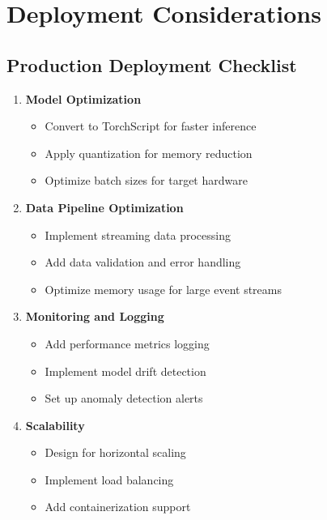 \documentclass[12pt,a4paper]{article}
\begin{document}
\section{Deployment Considerations}

\subsection{Production Deployment Checklist}

\begin{enumerate}
    \item \textbf{Model Optimization}
    \begin{itemize}
        \item Convert to TorchScript for faster inference
        \item Apply quantization for memory reduction
        \item Optimize batch sizes for target hardware
    \end{itemize}
    
    \item \textbf{Data Pipeline Optimization}
    \begin{itemize}
        \item Implement streaming data processing
        \item Add data validation and error handling
        \item Optimize memory usage for large event streams
    \end{itemize}
    
    \item \textbf{Monitoring and Logging}
    \begin{itemize}
        \item Add performance metrics logging
        \item Implement model drift detection
        \item Set up anomaly detection alerts
    \end{itemize}
    
    \item \textbf{Scalability}
    \begin{itemize}
        \item Design for horizontal scaling
        \item Implement load balancing
        \item Add containerization support
    \end{itemize}
\end{enumerate}
\end{document}

